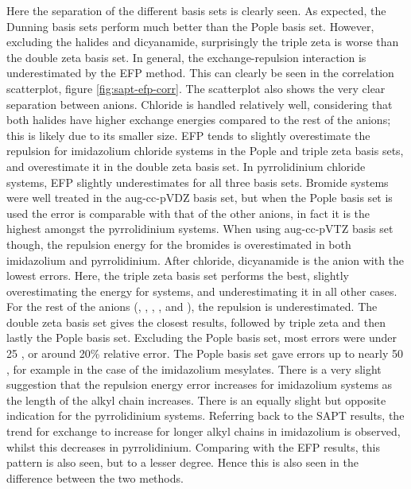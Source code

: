 \begin{multicols}{2}
Here the separation of the different basis sets is clearly seen.
As expected, the Dunning basis sets perform much better than the Pople basis set. 
However, excluding the halides and dicyanamide, surprisingly the triple zeta is worse than the double zeta basis set.
In general, the exchange-repulsion interaction is underestimated by the EFP method. 
This can clearly be seen in the correlation scatterplot, figure
\ref{fig:sapt-efp-corr}.
The scatterplot also shows the very clear separation between anions.
Chloride is handled relatively well, considering that both halides have higher exchange energies compared to the rest of the anions; this is likely due to its smaller size.
EFP tends to slightly overestimate the repulsion for imidazolium chloride systems in the Pople and triple zeta basis sets, and overestimate it in the double zeta basis set.
In pyrrolidinium chloride systems, EFP slightly underestimates for all three basis sets. 
Bromide systems were well treated in the aug-cc-pVDZ basis set, but when the Pople basis set is used the error is comparable with that of the other anions, in fact it is the highest amongst the pyrrolidinium systems.
When using aug-cc-pVTZ basis set though, the repulsion energy for the bromides is overestimated in both imidazolium and pyrrolidinium.
After chloride, dicyanamide is the anion with the lowest errors.
Here, the triple zeta basis set performs the best, slightly overestimating the energy for  systems, and underestimating it in all other cases.
For the rest of the anions (\bfl, \mes, \ntf, \pf, and \tos), the repulsion is underestimated. 
The double zeta basis set gives the closest results, followed by triple zeta and then lastly the Pople basis set.
Excluding the Pople basis set, most errors were under 25 \enUnit, or around 20\% relative error.
The Pople basis set gave errors up to nearly 50 \enUnit, for example in the case of the imidazolium mesylates.
There is a very slight suggestion that the repulsion energy error increases for imidazolium systems as the length of the alkyl chain increases. 
There is an equally slight but opposite indication for the pyrrolidinium systems.
Referring back to the SAPT results, the trend for exchange to increase for longer alkyl chains in imidazolium is observed, whilst this decreases in pyrrolidinium. 
Comparing with the EFP results, this pattern is also seen, but to a lesser degree.
Hence this is also seen in the difference between the two methods.


\end{multicols}
